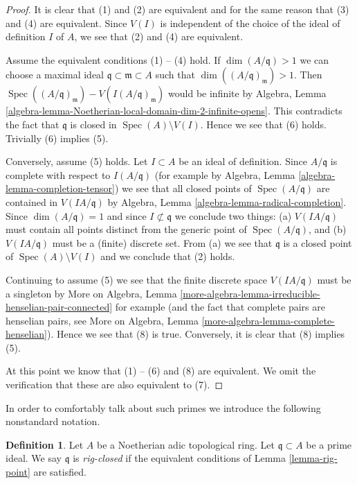 \documentclass{stacks-project}
\theoremstyle{plain}
\theoremstyle{definition}
\newtheorem{definition}[subsection]{Definition}
\theoremstyle{remark}
\numberwithin{equation}{subsection}
\def\Spec{\mathop{\mathrm{Spec}}}
\begin{document}
\begin{proof}
It is clear that (1) and (2) are equivalent and for the same reason
that (3) and (4) are equivalent.
Since $V(I)$ is independent of the choice of the ideal of definition
$I$ of $A$, we see that (2) and (4) are equivalent.

\medskip\noindent
Assume the equivalent conditions (1) -- (4) hold.
If $\dim(A/\mathfrak q) > 1$ we can choose a maximal
ideal $\mathfrak q \subset \mathfrak m \subset A$
such that $\dim((A/\mathfrak q)_\mathfrak m) > 1$.
Then $\Spec((A/\mathfrak q)_\mathfrak m) - V(I(A/\mathfrak q)_\mathfrak m)$
would be infinite by Algebra, Lemma
\ref{algebra-lemma-Noetherian-local-domain-dim-2-infinite-opens}.
This contradicts the fact that $\mathfrak q$ is closed in
$\Spec(A) \setminus V(I)$.
Hence we see that (6) holds. Trivially (6) implies (5).

\medskip\noindent
Conversely, assume (5) holds. Let $I \subset A$ be an ideal of definition.
Since $A/\mathfrak q$ is complete
with respect to $I(A/\mathfrak q)$ (for example by
Algebra, Lemma \ref{algebra-lemma-completion-tensor})
we see that all closed points of $\Spec(A/\mathfrak q)$ are
contained in $V(IA/\mathfrak q)$ by
Algebra, Lemma \ref{algebra-lemma-radical-completion}.
Since $\dim(A/\mathfrak q) = 1$ and since $I \not \subset \mathfrak q$
we conclude two things: (a) $V(IA/\mathfrak q)$ must contain
all points distinct from the generic point of $\Spec(A/\mathfrak q)$, and
(b) $V(IA/\mathfrak q)$ must be a (finite) discrete set.
From (a) we see that $\mathfrak q$ is a closed point of
$\Spec(A) \setminus V(I)$ and we conclude that (2) holds.

\medskip\noindent
Continuing to assume (5) we see that the finite discrete space
$V(IA/\mathfrak q)$ must be a singleton by More on Algebra, Lemma
\ref{more-algebra-lemma-irreducible-henselian-pair-connected}
for example (and the fact that complete pairs are henselian pairs, see
More on Algebra, Lemma \ref{more-algebra-lemma-complete-henselian}).
Hence we see that (8) is true.
Conversely, it is clear that (8) implies (5).

\medskip\noindent
At this point we know that (1) -- (6) and (8) are equivalent.
We omit the verification that these are also equivalent to (7).
\end{proof}

\noindent
In order to comfortably talk about such primes we introduce
the following nonstandard notation.

\begin{definition}
\label{definition-rig-closed}
Let $A$ be a Noetherian adic topological ring. Let
$\mathfrak q \subset A$ be a prime ideal. We say
$\mathfrak q$ is {\it rig-closed} if the equivalent
conditions of Lemma \ref{lemma-rig-point} are satisfied.
\end{definition}
\end{document}
